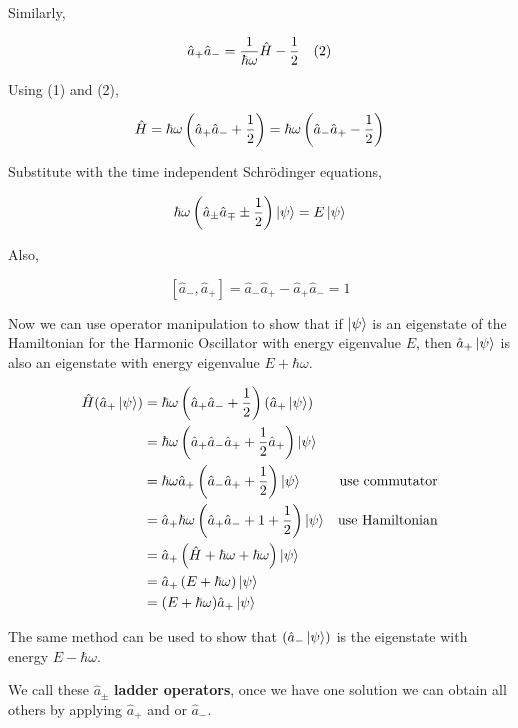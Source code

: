 \documentclass[english, 11pt]{article}
\begin{document}
       Similarly,

       \begin{align*}
         \hat{a}_+\hat{a}_- &  = \frac{1}{\hbar\omega}\hat{H} - \frac{1}{2} & (2)
       \end{align*}

       Using (1) and (2),

       \[ \hat{H} = \hbar \omega \left(\hat{a}_+\hat{a}_- + \frac{1}{2}\right) = \hbar \omega \left(\hat{a}_-\hat{a}_+ - \frac{1}{2}\right) \]

       Substitute with the time independent Schrödinger equations,

       \[ \hbar\omega \left( \hat{a}_\pm\hat{a}_\mp  \pm \frac{1}{2} \right)\left|\psi\right\rangle = E\left|\psi\right\rangle \]

       Also,

       \[ [\hat{a}_-,\hat{a}_+] = \hat{a}_-\hat{a}_+ - \hat{a}_+\hat{a}_- = 1 \]

       Now we can use operator manipulation to show that if $\left|\psi\right\rangle$ is an eigenstate of the Hamiltonian for the Harmonic Oscillator with energy eigenvalue $E$, then $\hat{a}_+\left|\psi\right\rangle$ is also an eigenstate with energy eigenvalue $E + \hbar \omega$.

       \begin{align*}
         \hat{H} (\hat{a}_+\left|\psi\right\rangle) & = \hbar \omega \left( \hat{a}_+\hat{a}_- + \frac{1}{2} \right)\left( \hat{a}_+\left|\psi\right\rangle \right) \\
         & = \hbar \omega \left( \hat{a}_+\hat{a}_-\hat{a}_+ + \frac{1}{2}\hat{a}_+\right)\left|\psi\right\rangle \\
         & = \hbar \omega \hat{a}_+ \left( \hat{a}_-\hat{a}_+ + \frac{1}{2} \right)\left|\psi\right\rangle & \mbox{use commutator} \\
         & = \hat{a}_+\hbar \omega \left( \hat{a}_+\hat{a}_- + 1 + \frac{1}{2} \right)\left|\psi\right\rangle & \mbox{use Hamiltonian} \\
         & = \hat{a}_+\left( \hat{H} + \hbar \omega + \hbar \omega \right)\left|\psi\right\rangle \\
         & = \hat{a}_+ \left( E + \hbar \omega \right)\left|\psi\right\rangle \\
         & = (E + \hbar \omega) \hat{a}_+\left|\psi\right\rangle
       \end{align*}

       The same method can be used to show that $(\hat{a}_-\left|\psi\right\rangle)$ is the eigenstate with energy $E - \hbar \omega$.\newline

       We call these $\hat{a}_{\pm}$ \textbf{ladder operators}, once we have one solution we can obtain all others by applying $\hat{a}_+$ and or $\hat{a}_-$.
\end{document}
